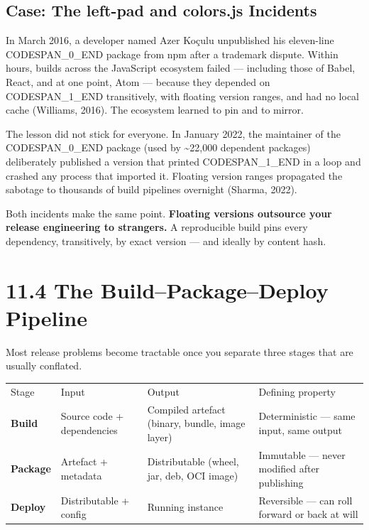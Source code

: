 \documentclass[11pt,a4paper]{book}
\begin{document}
\subsection{Case: The left-pad and colors.js Incidents}

In March 2016, a developer named Azer Koçulu unpublished his eleven-line CODESPAN\_0\_END package from npm after a trademark dispute. Within hours, builds across the JavaScript ecosystem failed --- including those of Babel, React, and at one point, Atom --- because they depended on CODESPAN\_1\_END transitively, with floating version ranges, and had no local cache (Williams, 2016). The ecosystem learned to pin and to mirror.

The lesson did not stick for everyone. In January 2022, the maintainer of the CODESPAN\_0\_END package (used by \textasciitilde{}22,000 dependent packages) deliberately published a version that printed CODESPAN\_1\_END in a loop and crashed any process that imported it. Floating version ranges propagated the sabotage to thousands of build pipelines overnight (Sharma, 2022).

Both incidents make the same point. \textbf{Floating versions outsource your release engineering to strangers.} A reproducible build pins every dependency, transitively, by exact version --- and ideally by content hash.

\medskip

\section{11.4 The Build--Package--Deploy Pipeline}

Most release problems become tractable once you separate three stages that are usually conflated.

\begin{tabular}{llll}
\hline
Stage & Input & Output & Defining property \\
\textbf{Build} & Source code + dependencies & Compiled artefact (binary, bundle, image layer) & Deterministic --- same input, same output \\
\textbf{Package} & Artefact + metadata & Distributable (wheel, jar, deb, OCI image) & Immutable --- never modified after publishing \\
\textbf{Deploy} & Distributable + config & Running instance & Reversible --- can roll forward or back at will \\
\hline
\end{tabular}
\end{document}
